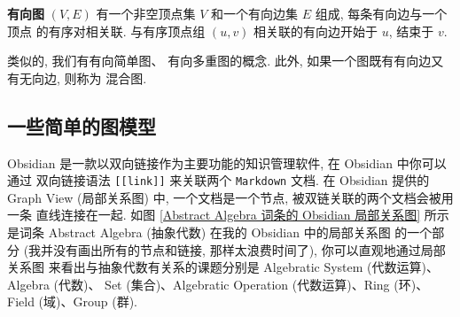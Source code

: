 \documentclass[10pt,UTF8]{book} %
\begin{document}
\begin{definition}
    \textbf{有向图} $(V, E)$ 有一个非空顶点集 $V$ 和一个有向边集 $E$ 组成, 每条有向边与一个顶点
    的有序对相关联. 与有序顶点组 $(u, v)$ 相关联的有向边开始于 $u$, 结束于 $v$.
\end{definition}

类似的, 我们有有向简单图、 有向多重图的概念. 此外, 如果一个图既有有向边又有无向边, 则称为
混合图.

\subsection{一些简单的图模型}

\begin{example}
    Obsidian 是一款以双向链接作为主要功能的知识管理软件, 在 Obsidian 中你可以通过
    双向链接语法 \lstinline|[[link]]| 来关联两个 \lstinline|Markdown| 文档.
    在 Obsidian 提供的 Graph View (局部关系图) 中, 一个文档是一个节点,
    被双链关联的两个文档会被用一条
    直线连接在一起. 如图 \ref{Abstract Algebra 词条的 Obsidian 局部关系图} 所示是词条 Abstract Algebra (抽象代数) 在我的 Obsidian 中的局部关系图
    的一个部分 (我并没有画出所有的节点和链接, 那样太浪费时间了), 你可以直观地通过局部关系图
    来看出与抽象代数有关系的课题分别是 Algebratic System (代数运算)、Algebra (代数)、
    Set (集合)、Algebratic Operation (代数运算)、Ring (环)、Field (域)、Group (群).
    \begin{figure}[H]
        \centering



        \begin{tikzpicture}[x=0.75pt,y=0.75pt,yscale=-1,xscale=1]
        

\end{tikzpicture}
\end{figure}
\end{example}
\end{document}
